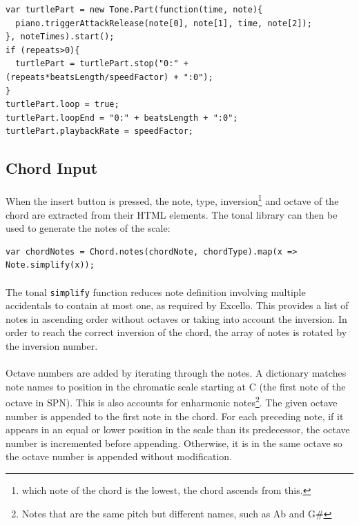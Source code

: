 \begin{verbatim}
var turtlePart = new Tone.Part(function(time, note){
  piano.triggerAttackRelease(note[0], note[1], time, note[2]);
}, noteTimes).start();
if (repeats>0){
  turtlePart = turtlePart.stop("0:" + (repeats*beatsLength/speedFactor) + ":0");
}
turtlePart.loop = true;
turtlePart.loopEnd = "0:" + beatsLength + ":0";
turtlePart.playbackRate = speedFactor;
\end{verbatim}

\subsection{Chord Input}

\paragraph{} When the insert button is pressed, the note, type, inversion\footnote{which note of the chord is the lowest, the chord ascends from this.} and octave of the chord are extracted from their HTML elements. The tonal library can then be used to generate the notes of the scale:

\begin{verbatim}
var chordNotes = Chord.notes(chordNote, chordType).map(x => Note.simplify(x));
\end{verbatim}

\paragraph{} The tonal \texttt{simplify} function reduces note definition involving multiple accidentals to contain at most one, as required by Excello. This provides a list of notes in ascending order without octaves or taking into account the inversion. In order to reach the correct inversion of the chord, the array of notes is rotated by the inversion number.

\paragraph{} Octave numbers are added by iterating through the notes. A dictionary matches note names to position in the chromatic scale starting at C (the first note of the octave in SPN). This is also accounts for enharmonic notes\footnote{Notes that are the same pitch but different names, such as Ab and G\#}. The given octave number is appended to the first note in the chord. For each preceding note, if it appears in an equal or lower position in the scale than its predecessor, the octave number is incremented before appending. Otherwise, it is in the same octave so the octave number is appended without modification.

